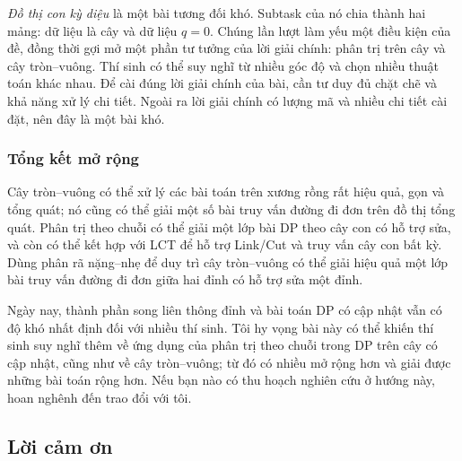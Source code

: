 \documentclass[11pt]{article}
\begin{document}
\emph{Đồ thị con kỳ diệu} là một bài tương đối khó. Subtask của nó chia thành
hai mảng: dữ liệu là cây và dữ liệu \(q=0\). Chúng lần lượt làm yếu một điều
kiện của đề, đồng thời gợi mở một phần tư tưởng của lời giải chính: phân trị
trên cây và cây tròn--vuông. Thí sinh có thể suy nghĩ từ nhiều góc độ và chọn
nhiều thuật toán khác nhau. Để cài đúng lời giải chính của bài, cần tư duy đủ
chặt chẽ và khả năng xử lý chi tiết. Ngoài ra lời giải chính có lượng mã và
nhiều chi tiết cài đặt, nên đây là một bài khó.

\subsubsection{Tổng kết mở rộng}

Cây tròn--vuông có thể xử lý các bài toán trên xương rồng rất hiệu quả, gọn và
tổng quát; nó cũng có thể giải một số bài truy vấn đường đi đơn trên đồ thị
tổng quát. Phân trị theo chuỗi có thể giải một lớp bài DP theo cây con có hỗ
trợ sửa, và còn có thể kết hợp với LCT để hỗ trợ Link/Cut và truy vấn cây con
bất kỳ. Dùng phân rã nặng--nhẹ để duy trì cây tròn--vuông có thể giải hiệu quả
một lớp bài truy vấn đường đi đơn giữa hai đỉnh có hỗ trợ sửa một đỉnh.

Ngày nay, thành phần song liên thông đỉnh và bài toán DP có cập nhật vẫn có độ
khó nhất định đối với nhiều thí sinh. Tôi hy vọng bài này có thể khiến thí
sinh suy nghĩ thêm về ứng dụng của phân trị theo chuỗi trong DP trên cây có
cập nhật, cũng như về cây tròn--vuông; từ đó có nhiều mở rộng hơn và giải được
những bài toán rộng hơn. Nếu bạn nào có thu hoạch nghiên cứu ở hướng này, hoan
nghênh đến trao đổi với tôi.

\subsection*{Lời cảm ơn}
\end{document}
